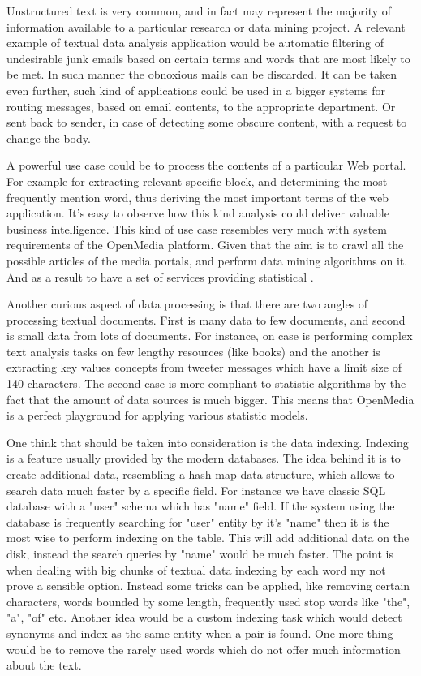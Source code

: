 Unstructured text is very common, and in fact may represent the majority of information available to a particular research or data mining project. A relevant example of textual data analysis application would be automatic filtering of undesirable junk emails based on certain terms and words that are most likely to be met. In such manner the obnoxious mails can be discarded. It can be taken even further, such kind of applications could be used in a bigger systems for routing messages, based on email contents, to the appropriate department. Or sent back to sender, in case of detecting some obscure content, with a request to change the body.

A powerful use case could be to process the contents of a particular Web portal. For example for extracting relevant specific block, and determining the most frequently mention word, thus deriving the most important terms of the web application. It's easy to observe how this kind analysis could deliver valuable business intelligence. This kind of use case resembles very much with system requirements of the OpenMedia platform. Given that the aim is to crawl all the possible articles of the media portals, and perform data mining algorithms on it. And as a result to have a set of services providing statistical .

Another curious aspect of data processing is that there are two angles of processing textual documents. First is many data to few documents, and second is small data from lots of documents. For instance, on case is performing complex text analysis tasks on few lengthy resources (like books) and the another is extracting key values concepts from tweeter messages which have a limit size of 140 characters. The second case is more compliant to statistic algorithms by the fact that the amount of data sources is much bigger. This means that OpenMedia is a perfect playground for applying various statistic models.

One think that should be taken into consideration is the data indexing. Indexing is a feature usually provided by the modern databases. The idea behind it is to create additional data, resembling a hash map data structure, which allows to search data much faster by a specific field. For instance we have classic SQL database with a "user" schema which has "name" field. If the system using the database is frequently searching for "user" entity by it's "name" then it is the most wise to perform indexing on the table. This will add additional data on the disk, instead the search queries by "name" would be much faster. The point is when dealing with big chunks of textual data indexing by each word my not prove a sensible option. Instead some tricks can be applied, like removing certain characters, words bounded by some length, frequently used stop words like "the", "a", "of" etc. Another idea would be a custom indexing task which would detect synonyms and index as the same entity when a pair is found. One more thing would be to remove the rarely used words which do not offer much information about the text.

